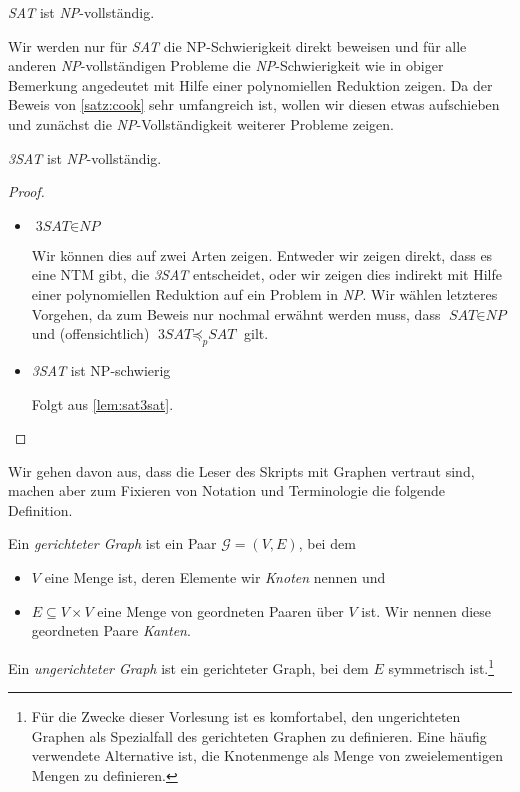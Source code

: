 \begin{Satz}[Cook]\label{satz:cook}
	\textit{SAT} ist \textit{NP}-vollständig.
\end{Satz}
Wir werden nur für \textit{SAT} die NP-Schwierigkeit direkt beweisen und für alle anderen \textit{NP}-vollständigen Probleme die \textit{NP}-Schwierigkeit wie in obiger Bemerkung angedeutet mit Hilfe einer polynomiellen Reduktion zeigen.
Da der Beweis von \autoref{satz:cook} sehr umfangreich ist, wollen wir diesen etwas aufschieben und zunächst die \textit{NP}-Vollständigkeit weiterer Probleme zeigen.


\begin{Satz}[name={[\textit{3SAT} ist \textit{NP}-vollständig]}]
	\textit{3SAT} ist \textit{NP}-vollständig.
\end{Satz}
\begin{proof}
 \
 \begin{itemize}
  \item $\textit{3SAT}\in \textit{NP}$
  
  Wir können dies auf zwei Arten zeigen. 
  Entweder wir zeigen direkt, dass es eine \ac{NTM} gibt, die \textit{3SAT} entscheidet, oder 
  wir zeigen dies indirekt mit Hilfe einer polynomiellen Reduktion auf ein Problem in \textit{NP}.
  Wir wählen letzteres Vorgehen, da zum Beweis nur nochmal erwähnt werden muss, dass $\textit{SAT}\in \textit{NP}$ und (offensichtlich) $\textit{3SAT}\preceq_p \textit{SAT}$ gilt.
  
  \item \textit{3SAT} ist NP-schwierig
  
  Folgt aus \autoref{lem:sat3sat}.\qedhere
 \end{itemize}
\end{proof}


Wir gehen davon aus, dass die Leser des Skripts mit Graphen vertraut sind, machen aber zum Fixieren von Notation und Terminologie die folgende Definition.
\begin{Def}
 Ein \emph{gerichteter Graph} ist ein Paar $\mathcal{G}=(V,E)$, bei dem
 \begin{itemize}
  \item $V$ eine Menge ist, deren Elemente wir \emph{Knoten} nennen und
  \item $E\subseteq V\times V$ eine Menge von geordneten Paaren über $V$ ist. 
  Wir nennen diese geordneten Paare \emph{Kanten}.
 \end{itemize}
 Ein \emph{ungerichteter Graph} ist ein gerichteter Graph, bei dem $E$ symmetrisch ist.\footnote{Für die Zwecke dieser Vorlesung ist es komfortabel, den ungerichteten Graphen als Spezialfall des gerichteten Graphen zu definieren. Eine häufig verwendete Alternative ist, die Knotenmenge als Menge von zweielementigen Mengen zu definieren.}
\end{Def}



